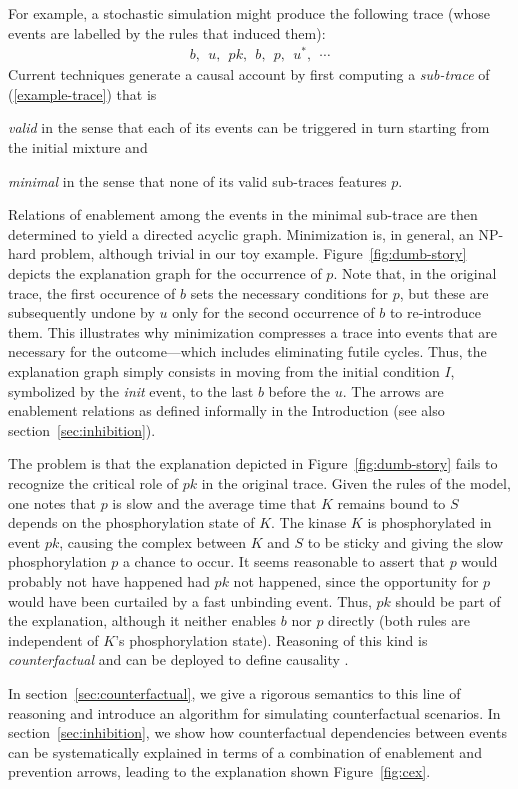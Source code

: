 For example, a stochastic simulation might produce the following trace
(whose events are labelled by the rules that induced them):
\begin{align}
  \label{example-trace} b,\ \ u,\ \ pk,\ \ b,\ \ p,\ \
  u^{*},\ \ \cdots
\end{align} 
Current
techniques \cite{DBLP:conf/fsttcs/DanosFFHH12,DanosEtAl-CONCUR07}
generate a causal account by first computing a \emph{sub-trace} of
(\ref{example-trace}) that is
\begin{inparaenum}[(i)]
\item \emph{valid} in the sense that each of its events can be
  triggered in turn starting from the initial mixture and
\item \emph{minimal} in the sense that none of its valid sub-traces
  features $p$.
\end{inparaenum}
Relations of enablement among the events in the minimal sub-trace are
then determined to yield a directed acyclic graph. Minimization is, in
general, an NP-hard problem, although trivial in our toy
example. Figure~\ref{fig:dumb-story} depicts the explanation graph for
the occurrence of $p$. Note that, in the original trace, the first
occurence of $b$ sets the necessary conditions for $p$, but these are
subsequently undone by $u$ only for the second occurrence of $b$ to
re-introduce them. This illustrates why minimization compresses a
trace into events that are necessary for the outcome---which includes
eliminating futile cycles. Thus, the explanation graph simply consists
in moving from the initial condition $I$, symbolized by the
\emph{init} event, to the last $b$ before the $u$. The arrows are
enablement relations as defined informally in the Introduction (see
also section~\ref{sec:inhibition}).



The problem is that the explanation depicted in
Figure~\ref{fig:dumb-story} fails to recognize the critical role of
$pk$ in the original trace. Given the rules of the model, one notes
that $p$ is slow and the average time that $K$ remains bound to $S$
depends on the phosphorylation state of $K$. The kinase $K$ is
phosphorylated in event $pk$, causing the complex between $K$ and $S$
to be sticky and giving the slow phosphorylation $p$ a chance to
occur. It seems reasonable to assert that $p$ would probably not have
happened had $pk$ not happened, since the opportunity for $p$ would
have been curtailed by a fast unbinding event. Thus, $pk$ should be
part of the explanation, although it neither enables $b$ nor $p$
directly (both rules are independent of $K$'s phosphorylation
state). Reasoning of this kind is \emph{counterfactual} and can be
deployed to define causality
\cite{lewis1974causation,pearl2009causality}.

In section~\ref{sec:counterfactual}, we give a rigorous semantics to
this line of reasoning and introduce an algorithm for simulating
counterfactual scenarios. In section~\ref{sec:inhibition}, we show how
counterfactual dependencies between events can be systematically
explained in terms of a combination of enablement and prevention
arrows, leading to the explanation shown Figure~\ref{fig:cex}. 
